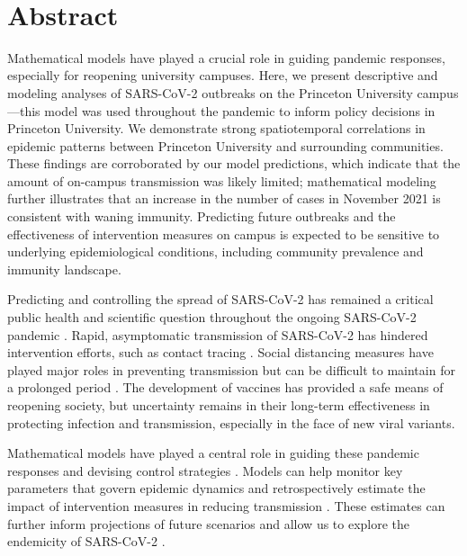 \documentclass[12pt]{article}
\date{\today}
\begin{document}
\begin{flushleft}{
	\Large
	\textbf{}
}
\newline
\\ 
\end{flushleft}

\section*{Abstract}

Mathematical models have played a crucial role in guiding pandemic responses, especially for reopening university campuses.
Here, we present descriptive and modeling analyses of SARS-CoV-2 outbreaks on the Princeton University campus---this model was used throughout the pandemic to inform policy decisions in Princeton University.
We demonstrate strong spatiotemporal correlations in epidemic patterns between Princeton University and surrounding communities.
These findings are corroborated by our model predictions, which indicate that the amount of on-campus transmission was likely limited;
mathematical modeling further illustrates that an increase in the number of cases in November 2021 is consistent with waning immunity.
Predicting future outbreaks and the effectiveness of intervention measures on campus is expected to be sensitive to underlying epidemiological conditions, including community prevalence and immunity landscape. 

\pagebreak

Predicting and controlling the spread of SARS-CoV-2 has remained a critical public health and scientific question throughout the ongoing SARS-CoV-2 pandemic \citep{baker2021limits}.
Rapid, asymptomatic transmission of SARS-CoV-2 has hindered intervention efforts, such as contact tracing \citep{hellewell2020feasibility}.
Social distancing measures have played major roles in preventing transmission but can be difficult to maintain for a prolonged period \citep{galanti2021social}.
The development of vaccines has provided a safe means of reopening society, but uncertainty remains in their long-term effectiveness in protecting infection and transmission, especially in the face of new viral variants.

Mathematical models have played a central role in guiding these pandemic responses and devising control strategies \citep{metcalf2020mathematical}.
Models can help monitor key parameters that govern epidemic dynamics \citep{kraemer2021monitoring} and retrospectively estimate the impact of intervention measures in reducing transmission \citep{flaxman2020estimating}.
These estimates can further inform projections of future scenarios and allow us to explore the endemicity of SARS-CoV-2 \citep{kissler2020projecting,saad2020immune,lavine2021immunological,saad2021epidemiological}.
\end{document}
